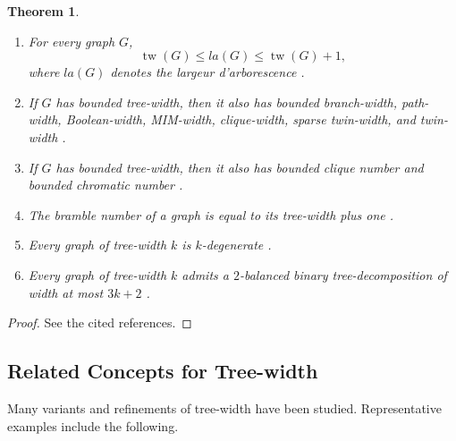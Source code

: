 \documentclass[10pt]{book}
\newtheorem{theorem}{Theorem}[section]
\theoremstyle{definition}
\begin{document}
\begin{theorem}
\begin{enumerate}
    \item For every graph \(G\),
    \[
    \operatorname{tw}(G)\leq la(G)\leq \operatorname{tw}(G)+1,
    \]
    where \(la(G)\) denotes the largeur d'arborescence \cite{van2002largeur,de1998multiplicities}.

    \item If \(G\) has bounded tree-width, then it also has bounded branch-width, path-width, Boolean-width, MIM-width, clique-width, sparse twin-width, and twin-width
    \cite{31,32,312,313}.

    \item If \(G\) has bounded tree-width, then it also has bounded clique number and bounded chromatic number
    \cite{311,417}.

    \item The bramble number of a graph is equal to its tree-width plus one
    \cite{216,239,240,241,242}.

    \item Every graph of tree-width \(k\) is \(k\)-degenerate
    \cite{400}.

    \item Every graph of tree-width \(k\) admits a \(2\)-balanced binary tree-decomposition of width at most \(3k+2\)
    \cite{401}.
\end{enumerate}
\end{theorem}

\begin{proof}
See the cited references.
\end{proof}

\subsection{Related Concepts for Tree-width}

Many variants and refinements of tree-width have been studied.  
Representative examples include the following.
\end{document}
